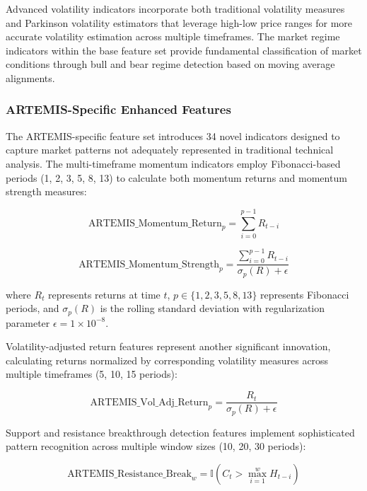 \documentclass[10pt,twocolumn]{article}
\begin{document}
Advanced volatility indicators incorporate both traditional volatility measures and Parkinson volatility estimators that leverage high-low price ranges for more accurate volatility estimation across multiple timeframes. The market regime indicators within the base feature set provide fundamental classification of market conditions through bull and bear regime detection based on moving average alignments.

\subsubsection{ARTEMIS-Specific Enhanced Features}

The ARTEMIS-specific feature set introduces 34 novel indicators designed to capture market patterns not adequately represented in traditional technical analysis. The multi-timeframe momentum indicators employ Fibonacci-based periods (1, 2, 3, 5, 8, 13) to calculate both momentum returns and momentum strength measures:

\begin{equation}
\text{ARTEMIS\_Momentum\_Return}_p = \sum_{i=0}^{p-1} R_{t-i}
\end{equation}

\begin{equation}
\text{ARTEMIS\_Momentum\_Strength}_p = \frac{\sum_{i=0}^{p-1} R_{t-i}}{\sigma_p(R) + \epsilon}
\end{equation}

where $R_t$ represents returns at time $t$, $p \in \{1,2,3,5,8,13\}$ represents Fibonacci periods, and $\sigma_p(R)$ is the rolling standard deviation with regularization parameter $\epsilon = 1 \times 10^{-8}$.

Volatility-adjusted return features represent another significant innovation, calculating returns normalized by corresponding volatility measures across multiple timeframes (5, 10, 15 periods):

\begin{equation}
\text{ARTEMIS\_Vol\_Adj\_Return}_p = \frac{R_t}{\sigma_p(R) + \epsilon}
\end{equation}

Support and resistance breakthrough detection features implement sophisticated pattern recognition across multiple window sizes (10, 20, 30 periods):

\begin{equation}
\text{ARTEMIS\_Resistance\_Break}_w = \mathbb{I}(C_t > \max_{i=1}^{w} H_{t-i})
\end{equation}
\end{document}
